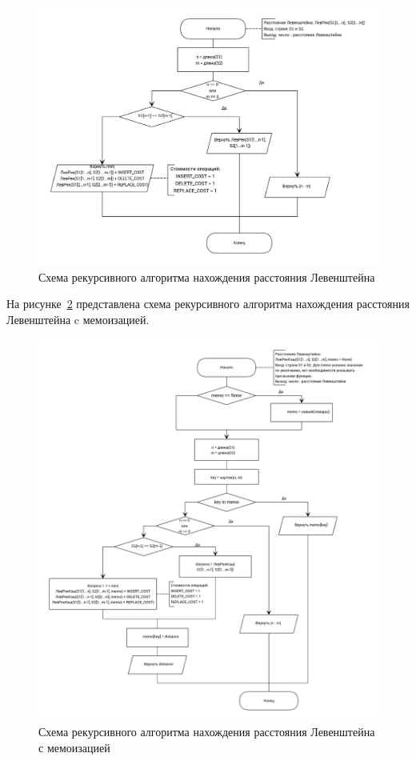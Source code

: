 \begin{figure}[!htb]
\centering
\includegraphics[width=\textwidth]{img/recursive_levenshtein.png}
\caption{Схема рекурсивного алгоритма нахождения расстояния \newline Левенштейна}
\label{fig:recur_lev}
\end{figure}

На рисунке~\ref{fig:recur_lev_cache} представлена схема рекурсивного алгоритма нахождения расстояния Левенштейна c мемоизацией.

\begin{figure}[!htb]
\centering
\includegraphics[width=\textwidth]{img/recursive_cache_levenshtein.png}
\caption{Схема рекурсивного алгоритма нахождения расстояния Левенштейна с мемоизацией}
\label{fig:recur_lev_cache}
\end{figure}


